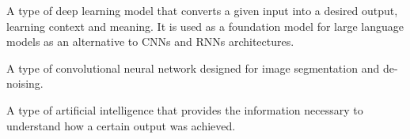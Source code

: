 \documentclass[gmd, manuscript]{copernicus}
\begin{document}
\begin{description}[style=nextline]
\item[Transformer Model (TM):] A type of deep learning model that converts a given input into a desired output, learning context and meaning. It is used as a foundation model for large language models as an alternative to CNNs and RNNs architectures.

\item[U-Net:] A type of convolutional neural network designed for image segmentation and de-noising.

\item[eXplainable AI (xAI):] A type of artificial intelligence that provides the information necessary to understand how a certain output was achieved.

\end{description}


\noappendix       %




\appendixfigures  %

\appendixtables   %







\end{document}
